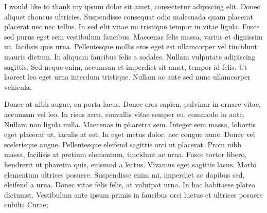 I would like to thank my ipsum dolor sit amet, consectetur adipiscing
elit. Donec aliquet rhoncus ultricies. Suspendisse consequat odio malesuada
quam placerat placerat nec nec tellus. In sed elit vitae mi tristique tempor in
vitae ligula. Fusce sed purus eget sem vestibulum faucibus. Maecenas felis
massa, varius et dignissim ut, facilisis quis urna. Pellentesque mollis eros
eget est ullamcorper vel tincidunt mauris dictum. In aliquam faucibus felis a
sodales. Nullam vulputate adipiscing sagittis. Sed neque enim, accumsan et
imperdiet sit amet, tempor id felis. Ut laoreet leo eget urna interdum
tristique. Nullam ac ante sed nunc ullamcorper vehicula.

Donec at nibh augue, eu porta lacus. Donec eros sapien, pulvinar in ornare
vitae, accumsan vel leo. In risus arcu, convallis vitae semper eu, commodo in
ante. Nullam non ligula nulla. Maecenas in pharetra sem. Integer sem massa,
lobortis eget placerat ut, iaculis at est. In eget metus dolor, nec congue
nunc. Donec vel scelerisque augue. Pellentesque eleifend sagittis orci ut
placerat. Proin nibh massa, facilisis at pretium elementum, tincidunt ac urna.
Fusce tortor libero, hendrerit ut pharetra quis, euismod a lectus. Vivamus eget
sagittis lacus. Morbi elementum ultrices posuere. Suspendisse enim mi,
imperdiet ac dapibus sed, eleifend a urna. Donec vitae felis felis, at volutpat
urna. In hac habitasse platea dictumst. Vestibulum ante ipsum primis in
faucibus orci luctus et ultrices posuere cubilia Curae;
